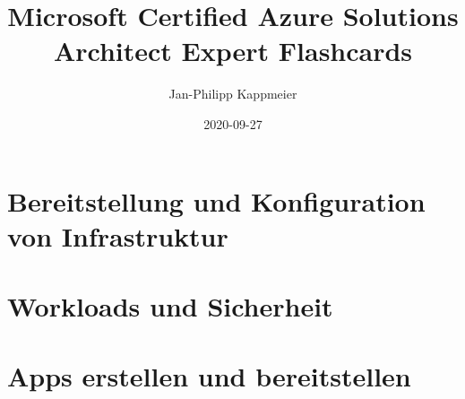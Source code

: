 \documentclass{scrartcl}
\newcommand{\sectioncard}[1]{
    \vspace*{\stretch{1}}
    \section{#1}
    \vspace*{\stretch{1}}
    \pagebreak
}
\begin{document}
    \title{Microsoft Certified Azure Solutions Architect Expert Flashcards}
    \date{2020-09-27}
    \author{Jan-Philipp Kappmeier}

    \clearpage\maketitle
    \thispagestyle{empty}
    \pagebreak

    \sectioncard{Bereitstellung und Konfiguration von Infrastruktur}

    

    

    

    

    

    

    

    

    

    \sectioncard{Workloads und Sicherheit}

    

    

    

    

    

    

    \sectioncard{Apps erstellen und bereitstellen}
\end{document}
